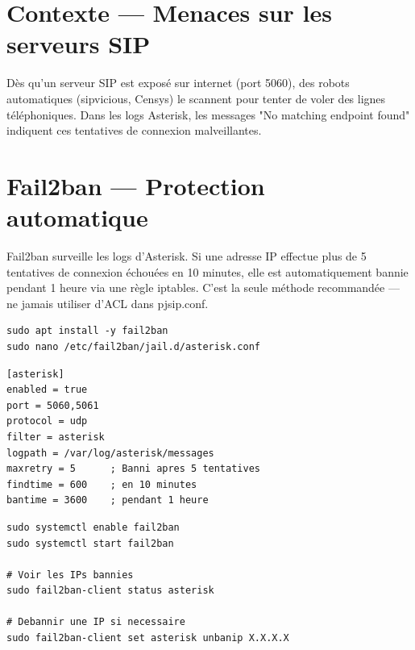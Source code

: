 \documentclass[a4paper,11pt]{report}
\begin{document}
\section{Contexte — Menaces sur les serveurs SIP}

\begin{dangerbox}
Dès qu'un serveur SIP est exposé sur internet (port 5060), des robots automatiques (sipvicious, Censys) le scannent pour tenter de voler des lignes téléphoniques. Dans les logs Asterisk, les messages "No matching endpoint found" indiquent ces tentatives de connexion malveillantes.
\end{dangerbox}

\section{Fail2ban — Protection automatique}

\begin{infobox}
Fail2ban surveille les logs d'Asterisk. Si une adresse IP effectue plus de 5 tentatives de connexion échouées en 10 minutes, elle est automatiquement bannie pendant 1 heure via une règle iptables. C'est la seule méthode recommandée — ne jamais utiliser d'ACL dans pjsip.conf.
\end{infobox}

\begin{codebox}
\begin{lstlisting}
sudo apt install -y fail2ban
sudo nano /etc/fail2ban/jail.d/asterisk.conf
\end{lstlisting}
\end{codebox}

\begin{codebox}
\begin{lstlisting}
[asterisk]
enabled = true
port = 5060,5061
protocol = udp
filter = asterisk
logpath = /var/log/asterisk/messages
maxretry = 5      ; Banni apres 5 tentatives
findtime = 600    ; en 10 minutes
bantime = 3600    ; pendant 1 heure
\end{lstlisting}
\end{codebox}

\begin{codebox}
\begin{lstlisting}
sudo systemctl enable fail2ban
sudo systemctl start fail2ban

# Voir les IPs bannies
sudo fail2ban-client status asterisk

# Debannir une IP si necessaire
sudo fail2ban-client set asterisk unbanip X.X.X.X
\end{lstlisting}
\end{codebox}
\end{document}
